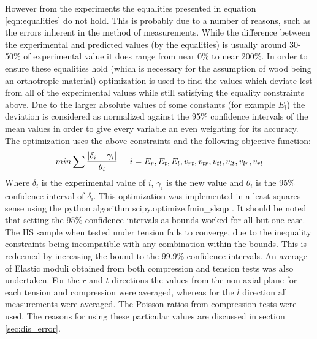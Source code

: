 \documentclass[10pt]{article}
\begin{document}
However from the experiments the equalities presented in equation \ref{eqn:equalities} do not hold. This is probably due to a number of reasons, such as the errors inherent in the method of measurements. While the difference between the experimental and predicted values (by the equalities) is usually around 30-50\% of experimental value it does range from near 0\% to near 200\%. In order to ensure these equalities hold (which is necessary for the assumption of wood being an orthotropic material) optimization is used to find the values which deviate lest from all of the experimental values while still satisfying the equality constraints above. Due to the larger absolute values of some constants (for example \(E_l\)) the deviation is considered as normalized against the 95\% confidence intervals of the mean values in order to give every variable an even weighting for its accuracy. The optimization uses the above constraints and the following objective function:
\begin{equation}\label{eqn:min}
min\sum \frac{|\delta_i - \gamma_i|}{ \theta_i} \hspace{0.5cm} i = E_r, E_t, E_l, v_{rt}, v_{tr}, v_{tl}, v_{lt}, v_{lr}, v_{rl}
\end{equation}
Where \(\delta_i\) is the experimental value of \(i\), \(\gamma_i\) is the new value and \(\theta_i\) is the 95\% confidence interval of \(\delta_i\). This optimization was implemented in a least squares sense using the  python algorithm scipy.optimize.fmin\_slsqp \citep{jones_scipy:_2001}. It should be noted that setting the 95\% confidence intervals as bounds worked for all but one case. The HS sample when tested under tension fails to converge, due to the inequality constraints being incompatible with any combination within the bounds. This is redeemed by increasing the bound to the 99.9\% confidence intervals. An average of  Elastic moduli obtained from both compression and tension tests was also undertaken. For the \(r\) and \(t\) directions the values from the non axial plane for each tension and compression were averaged, whereas for the \(l\) direction all measurements were averaged. The Poisson ratios from compression tests were used. The reasons for using these particular values are discussed in section \ref{sec:dis_error}.
\end{document}
